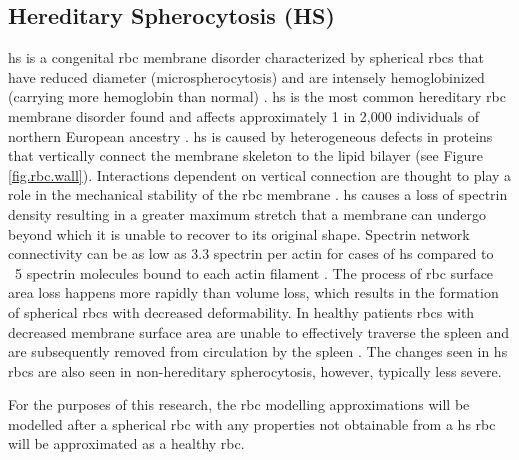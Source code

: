 \subsection{Hereditary Spherocytosis (HS)} \label{Sect.HS}
\noindent \ac{hs}  is a congenital \ac{rbc} membrane disorder characterized by spherical \ac{rbc}s that have reduced diameter (microspherocytosis) and are intensely hemoglobinized (carrying more hemoglobin than normal) \cite{Shape2010}. \ac{hs} is the most common hereditary \ac{rbc} membrane disorder found and affects approximately 1 in 2,000 individuals of northern European ancestry \cite{redblood2009}. \ac{hs} is caused by heterogeneous defects in proteins that vertically connect the membrane skeleton to the lipid bilayer\cite{redblood2009} (see Figure \ref{fig.rbc.wall}). Interactions dependent on vertical connection are thought to play a role in the mechanical stability of the \ac{rbc} membrane \cite{Shape2010}. \ac{hs} causes a loss of spectrin density resulting in a greater maximum stretch that a membrane can undergo beyond which it is unable to recover to its original shape. Spectrin network connectivity can be as low as 3.3 spectrin per actin for cases of \ac{hs} compared to ~5 spectrin molecules bound to each actin filament \cite{redblood2009,Shape2010,Minasyan2014}. The process of \ac{rbc} surface area loss happens more rapidly than volume loss, which results in the formation of spherical \ac{rbc}s with decreased deformability. In healthy patients \ac{rbc}s with decreased membrane surface area are unable to effectively traverse the spleen and are subsequently removed from circulation by the spleen \cite{Shape2010}. The changes seen in \ac{hs} \ac{rbc}s are also seen in non-hereditary spherocytosis, however, typically less severe.

For the purposes of this research, the \ac{rbc} modelling approximations will be modelled after a spherical \ac{rbc} with any properties not obtainable from a \ac{hs} \ac{rbc} will be approximated as a healthy \ac{rbc}.


